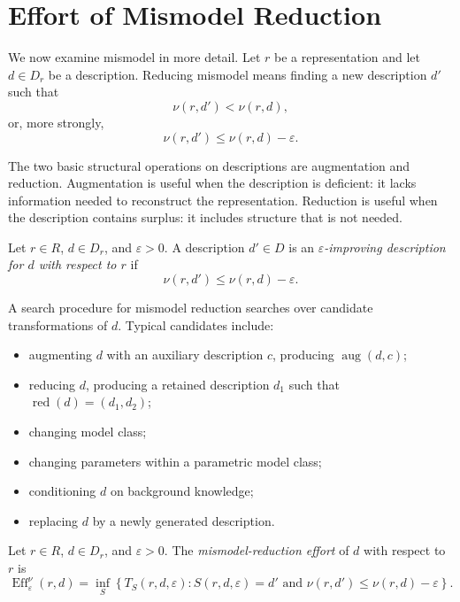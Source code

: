 \section{Effort of Mismodel Reduction}
\label{sec:effort_mismodel_reduction}

We now examine mismodel in more detail. Let \(r\) be a representation and let \(d\in D_r\) be a description. Reducing mismodel means finding a new description \(d'\) such that
\[
\nu(r,d')<\nu(r,d),
\]
or, more strongly,
\[
\nu(r,d')\leq \nu(r,d)-\varepsilon.
\]

The two basic structural operations on descriptions are augmentation and reduction. Augmentation is useful when the description is deficient: it lacks information needed to reconstruct the representation. Reduction is useful when the description contains surplus: it includes structure that is not needed.

\begin{definition}
Let \(r\in R\), \(d\in D_r\), and \(\varepsilon>0\). A description \(d'\in D\) is an \emph{\(\varepsilon\)-improving description for \(d\) with respect to \(r\)} if
\[
\nu(r,d')\leq \nu(r,d)-\varepsilon.
\]
\end{definition}

A search procedure for mismodel reduction searches over candidate transformations of \(d\). Typical candidates include:
\begin{itemize}
    \item augmenting \(d\) with an auxiliary description \(c\), producing \(\operatorname{aug}(d,c)\);
    \item reducing \(d\), producing a retained description \(d_1\) such that \(\operatorname{red}(d)=(d_1,d_2)\);
    \item changing model class;
    \item changing parameters within a parametric model class;
    \item conditioning \(d\) on background knowledge;
    \item replacing \(d\) by a newly generated description.
\end{itemize}

\begin{definition}
Let \(r\in R\), \(d\in D_r\), and \(\varepsilon>0\). The \emph{mismodel-reduction effort} of \(d\) with respect to \(r\) is
\[
\operatorname{Eff}^{\nu}_{\varepsilon}(r,d)
=
\inf_S
\left\{
T_S(r,d,\varepsilon):
S(r,d,\varepsilon)=d'
\text{ and }
\nu(r,d')\leq \nu(r,d)-\varepsilon
\right\}.
\]
\end{definition}

